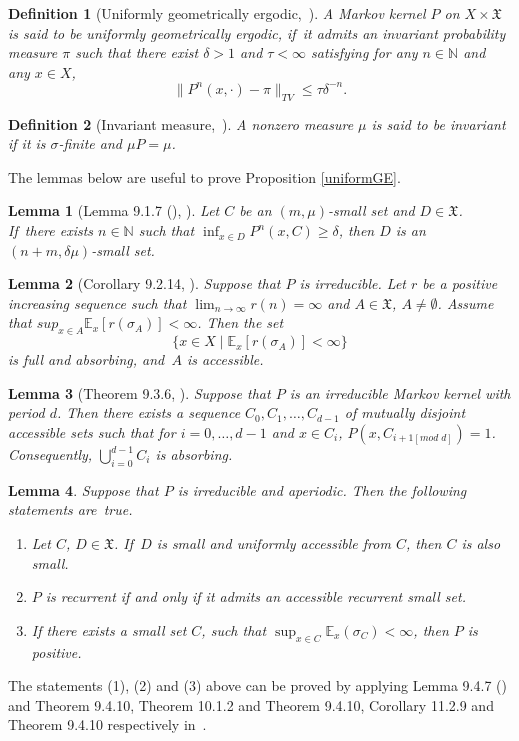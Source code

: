 \documentclass[11pt]{elsarticle}
\newtheorem{definition}{Definition}[section]
\newtheorem{lemma}{Lemma}[section]
\newcommand{\rmnum}[1]{\romannumeral #1}
\def\geq{\geqslant}
\def\leq{\leqslant}
\def\E{\mathbb{E}}
\def\N{\mathbb{N}}
\begin{document}
\begin{definition}[Uniformly geometrically ergodic,~\cite{DMPS18}]\label{Def_UGE}
	A Markov kernel $P$ on $X\times\mathfrak{X}$ is said to be  uniformly geometrically ergodic, if~it admits an invariant probability measure $\pi$ such that there exist $\delta>1$ and $\tau<\infty$ satisfying for any $n\in\N$ and any $x\in X$,
	$$\|P^n(x,\cdot)-\pi\|_{TV}\leq \tau\delta^{-n}.$$
\end{definition}
\begin{definition}[Invariant measure,~\cite{DMPS18}]
	A nonzero measure $\mu$ is said to be  invariant if it is $\sigma$-finite and $\mu P=\mu$.
\end{definition}

The lemmas below are useful to prove Proposition \ref{uniformGE}.

\begin{lemma}[{Lemma 9.1.7} (\rmnum{2}), \cite{DMPS18}]\label{Lem9.1.7app1}
	Let $C$ be an $(m,\mu)$-small set and $D\in\mathfrak{X}$. If~there exists $n\in\N$ such that $\inf_{x\in D}P^n(x, C)\geq\delta$, then $D$ is an $(n+m, \delta\mu)$-small set.
\end{lemma}

\begin{lemma}[{Corollary 9.2.14}, \cite{DMPS18}]\label{Coro9.2.14app1}
	Suppose that $P$ is irreducible. Let $r$ be a positive increasing sequence such that $\lim_{n\rightarrow\infty}r(n)=\infty$ and $A\in \mathfrak{X}$, $A\neq\emptyset$. Assume that $sup_{x\in A}\E_x[r(\sigma_A)] < \infty$. Then the set
	$$\{x\in X\;|\;\E_x[r(\sigma_A)]<\infty\}$$
	is full and absorbing, and~$A$ is accessible.
\end{lemma}

\begin{lemma}[{Theorem 9.3.6}, \cite{DMPS18}]\label{Thm9.3.6app1} Suppose that $P$ is an irreducible Markov kernel with period $d$. Then there exists a sequence $C_0,C_1,\ldots,C_{d-1}$ of mutually disjoint accessible sets such that for $i=0,\ldots,d-1$ and $x\in C_i$, $P\left(x,C_{i+1[mod\;d]}\right)=1$. Consequently, $\bigcup_{i=0}^{d-1}C_i$ is absorbing.
\end{lemma}

\begin{lemma}\label{lem-uniformacess-app1}
	Suppose that $P$ is irreducible and aperiodic. Then the following statements are~true. 
	\begin{enumerate}
		\item [(1)] Let $C$, $D\in\mathfrak{X}$. If~$D$ is small and uniformly accessible from $C$, then $C$ is also small.
		\item [(2)] $P$ is recurrent if and only if it admits an accessible recurrent small set.
		\item [(3)] If there exists a small set $C$, such that $\sup_{x\in C}\E_x(\sigma_C)<\infty$, then $P$ is positive.
	\end{enumerate}
\end{lemma}
The statements (1), (2) and (3) above can be proved by applying {Lemma 9.4.7} (\rmnum{2}) and {Theorem 9.4.10, Theorem 10.1.2 and Theorem 9.4.10, Corollary 11.2.9 and Theorem 9.4.10} respectively in~\cite{DMPS18}.
\end{document}
